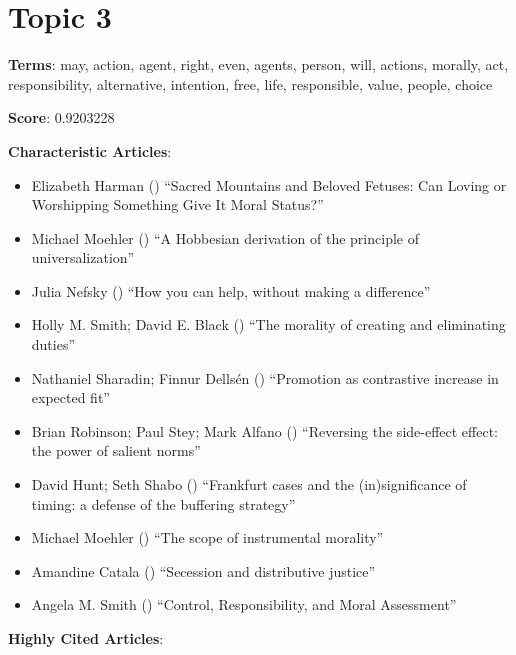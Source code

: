 \documentclass[
  10pt,
  letterpaper,
  DIV=11,
  numbers=noendperiod,
  twoside]{scrartcl}
\providecommand{\tightlist}{%
  \setlength{\itemsep}{0pt}\setlength{\parskip}{0pt}}\usepackage{longtable,booktabs,array}
\begin{document}
\section{Topic 3}\label{topic-3}

\textbf{Terms}: may, action, agent, right, even, agents, person, will,
actions, morally, act, responsibility, alternative, intention, free,
life, responsible, value, people, choice

\textbf{Score}: 0.9203228

\textbf{Characteristic Articles}:

\begin{itemize}
\tightlist
\item
  Elizabeth Harman () ``Sacred
  Mountains and Beloved Fetuses: Can Loving or Worshipping Something
  Give It Moral Status?''
\item
  Michael Moehler () ``A
  Hobbesian derivation of the principle of universalization''
\item
  Julia Nefsky () ``How you can
  help, without making a difference''
\item
  Holly M. Smith; David E. Black
  () ``The morality of creating
  and eliminating duties''
\item
  Nathaniel Sharadin; Finnur Dellsén
  () ``Promotion as contrastive
  increase in expected fit''
\item
  Brian Robinson; Paul Stey; Mark Alfano
  () ``Reversing the side-effect
  effect: the power of salient norms''
\item
  David Hunt; Seth Shabo ()
  ``Frankfurt cases and the (in)significance of timing: a defense of the
  buffering strategy''
\item
  Michael Moehler () ``The scope
  of instrumental morality''
\item
  Amandine Catala () ``Secession
  and distributive justice''
\item
  Angela M. Smith () ``Control,
  Responsibility, and Moral Assessment''
\end{itemize}

\textbf{Highly Cited Articles}:
\end{document}
